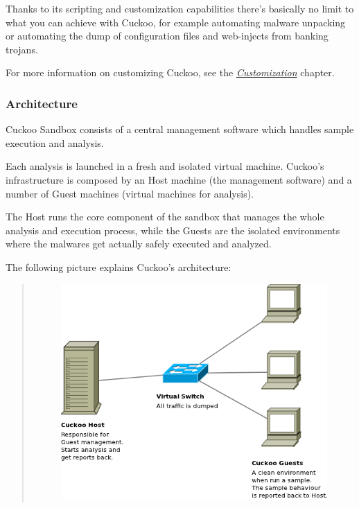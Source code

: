\documentclass[letterpaper,10pt,english]{sphinxmanual}
\begin{document}
Thanks to its scripting and customization capabilities there's basically no
limit to what you can achieve with Cuckoo, for example automating malware
unpacking or automating the dump of configuration files and web-injects
from banking trojans.

For more information on customizing Cuckoo, see the {\hyperref[customization/index::doc]{\emph{Customization}}}
chapter.


\subsubsection{Architecture}
\label{introduction/what:architecture}
Cuckoo Sandbox consists of a central management software which handles sample
execution and analysis.

Each analysis is launched in a fresh and isolated virtual machine.
Cuckoo's infrastructure is composed by an Host machine (the management
software) and a number of Guest machines (virtual machines for analysis).

The Host runs the core component of the sandbox that manages the whole
analysis and execution process, while the Guests are the isolated environments
where the malwares get actually safely executed and analyzed.

The following picture explains Cuckoo's architecture:
\begin{quote}
\begin{figure}[htbp]
\centering

\includegraphics{architecture.png}
\end{figure}
\end{quote}
\end{document}
